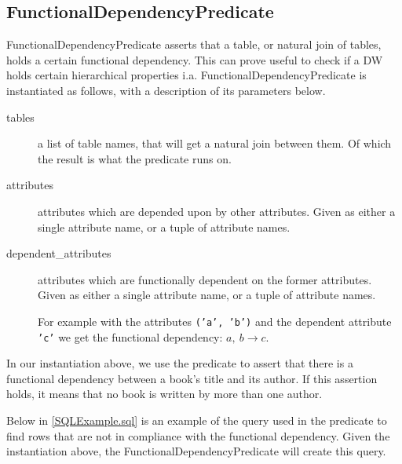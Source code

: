 \subsection{FunctionalDependencyPredicate}
FunctionalDependencyPredicate asserts that a table, or natural join of tables, holds a certain functional dependency. This can prove useful to check if a DW holds certain hierarchical properties i.a. FunctionalDependencyPredicate is instantiated as follows, with a description of its parameters below.


\begin{description}
\item [tables] a list of table names, that will get a natural join between them. Of which the result is what the predicate runs on. 
\item [attributes] attributes which are depended upon by other attributes. Given as either a single attribute name, or a tuple of attribute names.
\item [dependent\_attributes] attributes which are functionally dependent on the former attributes. Given as either a single attribute name, or a tuple of attribute names.

For example with the attributes \texttt{('a', 'b')} and the dependent attribute \texttt{'c'} we get the functional dependency: $a,\ b \rightarrow c$.
\end{description}

In our instantiation above, we use the predicate to assert that there is a functional dependency between a book's title and its author. If this assertion holds, it means that no book is written by more than one author. 

Below in \cref{SQLExample.sql} is an example of the query used in the predicate to find rows that are not in compliance with the functional dependency. Given the instantiation above, the FunctionalDependencyPredicate will create this query. 

